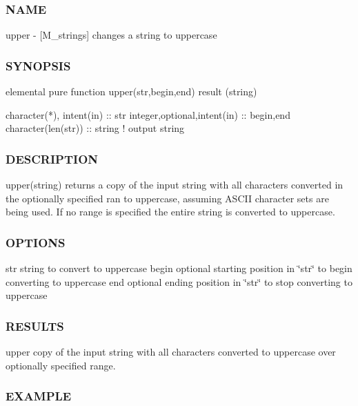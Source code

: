 \subsubsection*{N\+A\+ME}

upper -\/ \mbox{[}M\+\_\+strings\mbox{]} changes a string to uppercase 

\subsubsection*{S\+Y\+N\+O\+P\+S\+IS}

\begin{DoxyVerb}elemental pure function upper(str,begin,end) result (string)

 character(*), intent(in)    :: str
 integer,optional,intent(in) :: begin,end
 character(len(str))         :: string  ! output string
\end{DoxyVerb}


\subsubsection*{D\+E\+S\+C\+R\+I\+P\+T\+I\+ON}

upper(string) returns a copy of the input string with all characters converted in the optionally specified ran to uppercase, assuming A\+S\+C\+II character sets are being used. If no range is specified the entire string is converted to uppercase.

\subsubsection*{O\+P\+T\+I\+O\+NS}

str string to convert to uppercase begin optional starting position in \char`\"{}str\char`\"{} to begin converting to uppercase end optional ending position in \char`\"{}str\char`\"{} to stop converting to uppercase

\subsubsection*{R\+E\+S\+U\+L\+TS}

upper copy of the input string with all characters converted to uppercase over optionally specified range.

\subsubsection*{E\+X\+A\+M\+P\+LE}

